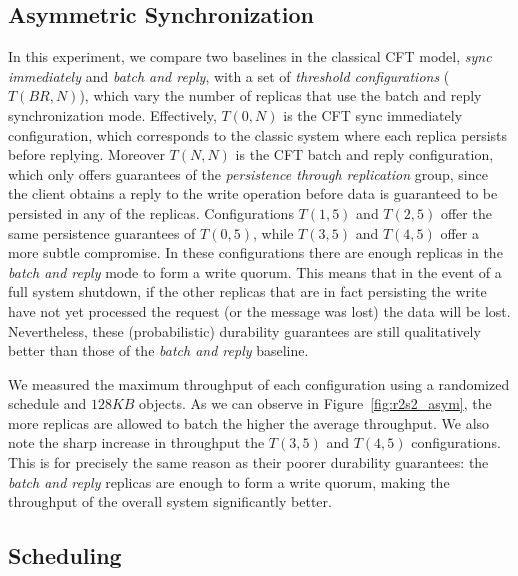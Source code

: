 \subsection{Asymmetric
Synchronization}\label{ssec:r2s2_eval_asym}

In this experiment, we compare two baselines in the classical
\ac{CFT} model, \emph{sync immediately} and \emph{batch and reply}, with a set of \emph{threshold
configurations} ($T(BR, N)$), which vary the number of replicas that use the
batch and reply synchronization mode. Effectively, $T(0, N)$ is
the \ac{CFT} sync immediately configuration, which corresponds to
the classic system where each replica persists before replying.
Moreover $T(N, N)$ is the \ac{CFT} batch and reply configuration,
which only offers guarantees of the \emph{persistence through
replication} group, since the client obtains a reply to the write
operation before data is guaranteed to be persisted in any of the
replicas. Configurations $T(1, 5)$ and $T(2, 5)$ offer the same
persistence guarantees of $T(0, 5)$, while $T(3, 5)$ and $T(4,
5)$ offer a more subtle compromise. In these configurations there are enough replicas in the \emph{batch and reply} mode
to form a write quorum. This means that in the
event of a full system shutdown, if the other replicas that are in
fact persisting the write have not yet processed the request (or
the message was lost) the data will be lost. Nevertheless, these
(probabilistic) durability guarantees are still qualitatively
better than those of the \emph{batch and reply} baseline.

We measured the maximum throughput of each configuration using a
randomized schedule and $128KB$ objects. As we can observe in
Figure~\ref{fig:r2s2_asym}, the more replicas are
allowed to batch the higher the average throughput. We also note
the sharp increase in throughput the $T(3, 5)$ and $T(4, 5)$
configurations. This is for precisely the same reason as their
poorer durability guarantees: the \emph{batch and reply} replicas
are enough to form a write quorum, making the throughput of the
overall system significantly better.


\subsection{Scheduling}\label{ssec:r2s2_eval_scheduling}

